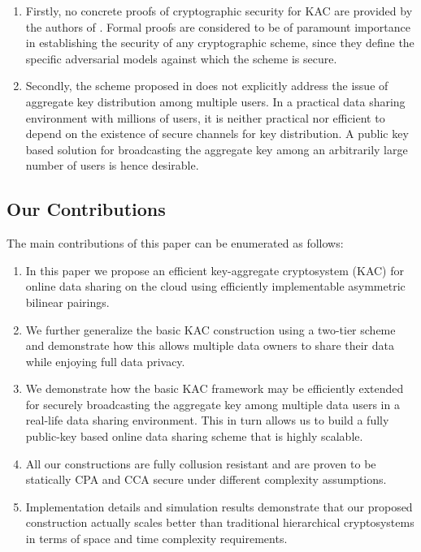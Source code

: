 \begin{enumerate}

 \item Firstly, no concrete proofs of cryptographic security for KAC are provided by the authors of \cite{chu2014key}. Formal proofs are considered to be of paramount importance in establishing the security of any cryptographic scheme, since they define the specific adversarial models against which the scheme is secure. 
 
 \item Secondly, the scheme proposed in \cite{chu2014key} does not explicitly address the issue of aggregate key distribution among multiple users. In a practical data sharing environment with millions of users, it is neither practical nor efficient to depend on the existence of secure channels for key distribution. A public key based solution for broadcasting the aggregate key among an arbitrarily large number of users is hence desirable.
\end{enumerate}

 
 
\subsection{Our Contributions}
\label{subsec:contributions}

The main contributions of this paper can be enumerated as follows:
\begin{enumerate}

 \item In this paper we propose an efficient key-aggregate cryptosystem (KAC) for online data sharing on the cloud using efficiently implementable asymmetric bilinear pairings.
 
 \item We further generalize the basic KAC construction using a two-tier scheme and demonstrate how this allows multiple data owners to share their data while enjoying full data privacy.
 
 \item We demonstrate how the basic KAC framework may be efficiently extended for securely broadcasting the aggregate key among multiple data users in a real-life data sharing environment. This in turn allows us to build a fully public-key based online data sharing scheme that is highly scalable.
 
 \item All our constructions are fully collusion resistant and are proven to be statically CPA and CCA secure under different complexity assumptions.
 
 \item Implementation details and simulation results demonstrate that our proposed construction actually scales better than traditional hierarchical cryptosystems in terms of space and time complexity requirements.
 
\end{enumerate}



 










